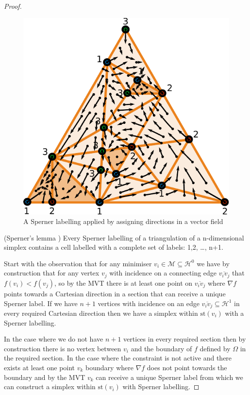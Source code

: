 \begin{proof}
\begin{figure} 
\centerline{\includegraphics[scale=1.0]{./Sperner2d_vec.pdf}}
{\caption{A Sperner labelling applied by assigning directions in a vector field  \label{fig:spernerfield}}}
\end{figure}

\begin{theorem} (Sperner's lemma \citep{Sperner1928}) Every Sperner labelling of a triangulation of a n-dimensional simplex contains a cell labelled with a complete set of labels:  {1,2, \dots, n+1}.
\end{theorem}

Start with the observation that for any minimiser $v_i \in \mathcal{M} \subseteq \mathcal{H}^0$ we have by construction that for any vertex $v_j$ with incidence on a connecting edge $\overline{v_i v_j}$ that $f(v_i) < f(v_j)$, so by the MVT there is at least one point on $\overline{v_i v_j}$ where $\nabla f$ points towards a Cartesian direction in a section that can receive a unique Sperner label. If we have $n+1$ vertices with incidence on an edge $ \overline{v_i v_j}\subseteq \mathcal{H}^1$ in every required Cartesian direction then we have a simplex within $\textrm{st}\left( v_i \right)$ with a Sperner labelling. 

In the case where we do not have $n+1$ vertices in every required section then by construction there is no vertex between $v_i$ and the boundary of $f$ defined by $\Omega$ in the required section. In the case where the constraint is not active and there exists at least one point $v_k$ boundary where $\nabla f$ does not point towards the boundary and by the MVT $v_k$ can receive a unique Sperner label from which we can construct a simplex within $\textrm{st}\left( v_i \right)$ with Sperner labelling.


\end{proof}
